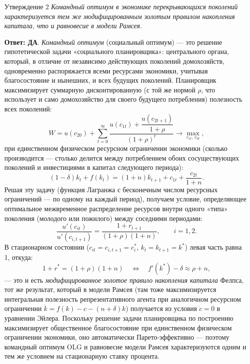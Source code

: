 \documentclass[10pt,a4paper]{article}
\newcommand{\qda}{\textbf{\color{yesgreen}Ответ: ДА}}
\newenvironment{answer}[2]{%
  \begin{qbox}{Утверждение #1}
  \textit{#2}\par\smallskip
}{%
  \end{qbox}\vspace{2pt}
}
\begin{document}
\begin{answer}{2}{Командный оптимум в экономике перекрывающихся поколений характеризуется тем же модифицированным золотым правилом накопления капитала, что и равновесие в модели Рамсея.}
\qda. \emph{Командный оптимум} (социальный оптимум) — это решение гипотетической задачи «социального планировщика»: центрального органа, который, в отличие от независимо действующих поколений домохозяйств, одновременно распоряжается всеми ресурсами экономики, учитывая благосостояние и нынешних, и всех будущих поколений. Планировщик максимизирует суммарную дисконтированную (с той же нормой $\rho$, что использует и само домохозяйство для своего будущего потребления) полезность всех поколений:
\[
W = u(c_{20}) + \sum_{t=0}^{\infty}\frac{u(c_{1t})+\dfrac{u(c_{2t+1})}{1+\rho}}{(1+\rho)^{t}} \to \max_{c_{1t},\,c_{2t}},
\]
при единственном физическом ресурсном ограничении экономики (сколько производится — столько делится между потреблением обоих сосуществующих поколений и инвестициями в капитал следующего периода):
\[
(1-\delta)k_t+f(k_t)=(1+n)k_{t+1}+c_{1t}+\frac{c_{2t}}{1+n}.
\]
Решая эту задачу (функция Лагранжа с бесконечным числом ресурсных ограничений — по одному на каждый период), получаем условие, определяющее оптимальное межвременное распределение ресурсов внутри одного «типа» поколения (молодого или пожилого) между соседними периодами:
\[
\frac{u'(c_{it})}{u'(c_{i,t+1})} = \frac{1+r_{t+1}}{(1+\rho)(1+n)},\qquad i=1,2.
\]
В стационарном состоянии ($c_{it}=c_{i,t+1}=c_i^{*}$, $k_t=k_{t+1}=k^{*}$) левая часть равна 1, откуда:
\[
1+r^{*}=(1+\rho)(1+n) \quad\Longleftrightarrow\quad f'(k^{*})-\delta \approx \rho+n,
\]
— это и есть \emph{модифицированное золотое правило накопления капитала} Фелпса, тот же результат, который в модели Рамсея (там тоже максимизируется интегральная полезность репрезентативного агента при аналогичном ресурсном ограничении $\dot k=f(k)-c-(n+\delta)k$) получается из условия $\dot c=0$ в уравнении Эйлера. Поскольку решение задачи планировщика по построению максимизирует общественное благосостояние при единственном физическом ограничении экономики, оно автоматически Парето-эффективно — поэтому командный оптимум OLG и равновесие модели Рамсея характеризуются одним и тем же условием на стационарную ставку процента.
\end{answer}
 
\end{document}
